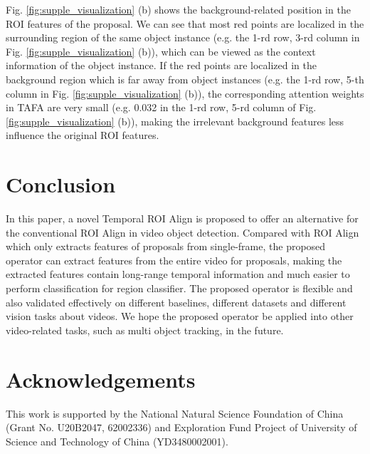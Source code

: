 \documentclass[letterpaper]{article} \usepackage{aaai21}  \usepackage{times}  \usepackage{helvet} \usepackage{courier}  \usepackage[hyphens]{url}  \usepackage{graphicx} \usepackage{hyperref}
\begin{document}
Fig. \ref{fig:supple_visualization} (b) shows the background-related position in the  ROI features of the proposal. We can see that most red points are localized in the surrounding region of the same object instance (e.g. the 1-rd row, 3-rd column in Fig. \ref{fig:supple_visualization} (b)), which can be viewed as the context information of the object instance. If the red points are localized in the background region which is far away from object instances (e.g. the 1-rd row, 5-th column in Fig. \ref{fig:supple_visualization} (b)), the corresponding attention weights in TAFA are very small (e.g. 0.032 in the 1-rd row, 5-rd column of Fig. \ref{fig:supple_visualization} (b)), making the irrelevant background features less influence the original ROI features.
 \section{Conclusion}


In this paper, a novel Temporal ROI Align is proposed to offer an alternative for the conventional ROI Align in video object detection. Compared with ROI Align which only extracts features of proposals from single-frame, the proposed operator can extract features from the entire video for proposals, making the extracted features contain long-range temporal information and much easier to perform classification for region classifier. The proposed operator is flexible and also validated effectively on different baselines, different datasets and different vision tasks about videos. We hope the proposed operator be applied into other video-related tasks, such as multi object tracking, in the future. 
%
 
\section{Acknowledgements}
This work is supported by the National Natural Science Foundation of China (Grant No. U20B2047, 62002336) and Exploration Fund Project of University of Science and Technology of China (YD3480002001).



\end{document}
